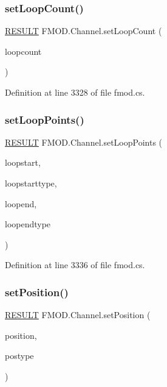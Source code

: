 \subsubsection{\texorpdfstring{set\+Loop\+Count()}{setLoopCount()}}
{\footnotesize\ttfamily \hyperlink{namespace_f_m_o_d_a305d1176ef3f8c8815861a60407ac33d}{R\+E\+S\+U\+LT} F\+M\+O\+D.\+Channel.\+set\+Loop\+Count (\begin{DoxyParamCaption}\item[{int}]{loopcount }\end{DoxyParamCaption})}



Definition at line 3328 of file fmod.\+cs.

\mbox{\label{class_f_m_o_d_1_1_channel_af10289a5935c20e113db049b714965d0}} 
\subsubsection{\texorpdfstring{set\+Loop\+Points()}{setLoopPoints()}}
{\footnotesize\ttfamily \hyperlink{namespace_f_m_o_d_a305d1176ef3f8c8815861a60407ac33d}{R\+E\+S\+U\+LT} F\+M\+O\+D.\+Channel.\+set\+Loop\+Points (\begin{DoxyParamCaption}\item[{uint}]{loopstart,  }\item[{\hyperlink{namespace_f_m_o_d_aff20975332f93ff2180d2681cb43929f}{T\+I\+M\+E\+U\+N\+IT}}]{loopstarttype,  }\item[{uint}]{loopend,  }\item[{\hyperlink{namespace_f_m_o_d_aff20975332f93ff2180d2681cb43929f}{T\+I\+M\+E\+U\+N\+IT}}]{loopendtype }\end{DoxyParamCaption})}



Definition at line 3336 of file fmod.\+cs.

\mbox{\label{class_f_m_o_d_1_1_channel_a9d61bc77c395603baae27de1f2292f07}} 
\subsubsection{\texorpdfstring{set\+Position()}{setPosition()}}
{\footnotesize\ttfamily \hyperlink{namespace_f_m_o_d_a305d1176ef3f8c8815861a60407ac33d}{R\+E\+S\+U\+LT} F\+M\+O\+D.\+Channel.\+set\+Position (\begin{DoxyParamCaption}\item[{uint}]{position,  }\item[{\hyperlink{namespace_f_m_o_d_aff20975332f93ff2180d2681cb43929f}{T\+I\+M\+E\+U\+N\+IT}}]{postype }\end{DoxyParamCaption})}



